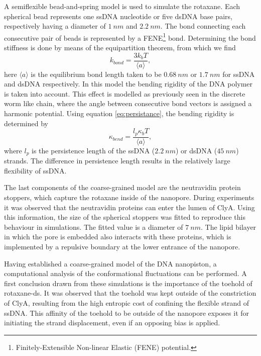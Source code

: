 A semiflexible bead-and-spring model is used to simulate the rotaxane. Each spherical
bead represents one ssDNA nucleotide or five dsDNA base pairs, respectively having a
diameter of $1\ nm$ and  $2.2\ nm$. The bond connecting each consecutive pair of beads is
represented by a FENE\footnote{Finitely-Extensible Non-linear
Elastic (FENE) potential.} bond.  Determining the bond stiffness is done by
means of the equipartition theorem, from which we find
  \begin{equation}
    k_{bond} = \frac{3 k_b T }{ \langle a \rangle},
  \end{equation}
here $\langle a \rangle$ is the equilibrium bond length taken to be $0.68\ nm$ or $1.7\
nm$ for ssDNA and dsDNA respectively. In this model the bending rigidity of the DNA
polymer is taken into account. This effect is modelled as previously seen in the discrete
worm like chain, where the angle between consecutive bond vectors is assigned a harmonic
potential. Using equation \ref{eq:persistance}, the bending rigidity is determined by
  \begin{equation}
    \kappa_{bend} = \frac{l_{p} \kappa_b T}{\langle a \rangle},
  \end{equation}
  where $l_p$ is the persistence length of the ssDNA ($2.2\ nm$) or dsDNA ($45\ nm$)
strands. The difference in persistence length results in the relatively large flexibility
of ssDNA.

The last components of the coarse-grained model are the neutravidin protein stoppers,
which capture the rotaxane inside of the nanopore. During experiments it was observed
that the neutravidin proteins can enter the lumen of ClyA. \cite{Lu2018} Using this
information, the
size of the spherical stoppers was fitted to reproduce this behaviour in simulations.
The fitted value is a diameter of $7\ nm$. The lipid bilayer in which the pore is
embedded also interacts with these proteins, which is implemented by a repulsive
boundary at the lower entrance of the nanopore.

Having established a coarse-grained model of the DNA nanopiston, a computational analysis
of the conformational fluctuations can be performed. A first conclusion drawn from these
simulations is the importance of the toehold of rotaxane-ds. It was observed
that the toehold was kept outside of the constriction of ClyA, resulting from the high
entropic cost of confining the flexible strand of ssDNA. This affinity of the toehold to
be outside of the nanopore exposes it for initiating the strand displacement, even if an
opposing bias is applied.

